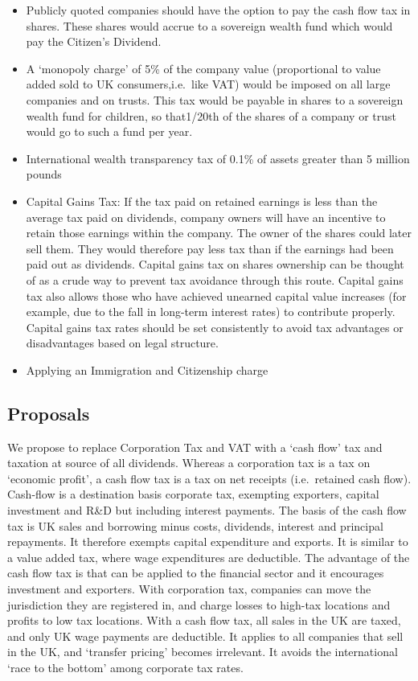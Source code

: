 \documentclass[]{tufte-handout}
\providecommand{\tightlist}{%
  \setlength{\itemsep}{0pt}\setlength{\parskip}{0pt}}
\begin{document}
\begin{itemize}
\tightlist
\item
  Publicly quoted companies should have the option to pay the cash flow
  tax in shares. These shares would accrue to a sovereign wealth fund
  which would pay the Citizen's Dividend.
\item
  A `monopoly charge' of 5\% of the company value (proportional to value
  added sold to UK consumers,i.e.~like VAT) would be imposed on all
  large companies and on trusts. This tax would be payable in shares to
  a sovereign wealth fund for children, so that1/20th of the shares of a
  company or trust would go to such a fund per year.
\item
  International wealth transparency tax of 0.1\% of assets greater than
  5 million pounds
\item
  Capital Gains Tax: If the tax paid on retained earnings is less than
  the average tax paid on dividends, company owners will have an
  incentive to retain those earnings within the company. The owner of
  the shares could later sell them. They would therefore pay less tax
  than if the earnings had been paid out as dividends. Capital gains tax
  on shares ownership can be thought of as a crude way to prevent tax
  avoidance through this route. Capital gains tax also allows those who
  have achieved unearned capital value increases (for example, due to
  the fall in long-term interest rates) to contribute properly. Capital
  gains tax rates should be set consistently to avoid tax advantages or
  disadvantages based on legal structure.
\item
  Applying an Immigration and Citizenship charge
\end{itemize}

\hypertarget{proposals-1}{%
\subsection{Proposals}\label{proposals-1}}

We propose to replace Corporation Tax and VAT with a `cash flow' tax and
taxation at source of all dividends. Whereas a corporation tax is a tax
on `economic profit', a cash flow tax is a tax on net receipts
(i.e.~retained cash flow). Cash-flow is a destination basis corporate
tax, exempting exporters, capital investment and R\&D but including
interest payments. The basis of the cash flow tax is UK sales and
borrowing minus costs, dividends, interest and principal repayments. It
therefore exempts capital expenditure and exports. It is similar to a
value added tax, where wage expenditures are deductible. The advantage
of the cash flow tax is that can be applied to the financial sector and
it encourages investment and exporters. With corporation tax, companies
can move the jurisdiction they are registered in, and charge losses to
high-tax locations and profits to low tax locations. With a cash flow
tax, all sales in the UK are taxed, and only UK wage payments are
deductible. It applies to all companies that sell in the UK, and
`transfer pricing' becomes irrelevant. It avoids the international `race
to the bottom' among corporate tax rates.
\end{document}
